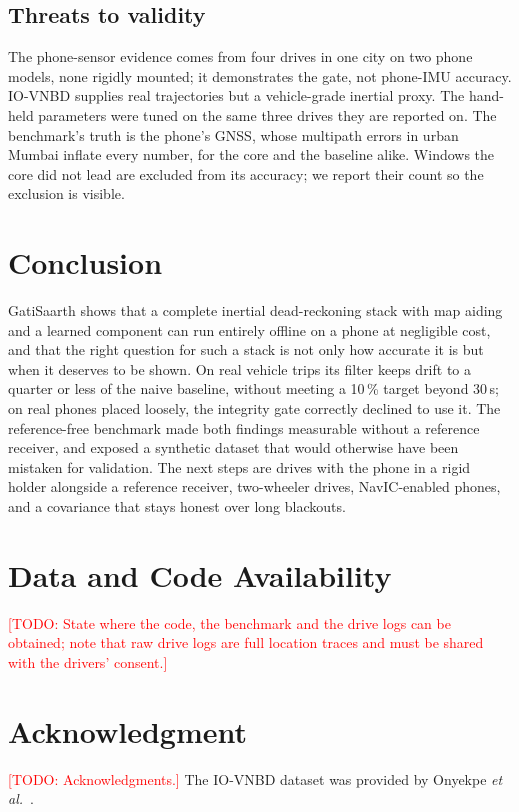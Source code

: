 \documentclass[conference]{IEEEtran}
\newcommand{\todo}[1]{\textcolor{red}{[TODO: #1]}}
\begin{document}
\subsection{Threats to validity}
The phone-sensor evidence comes from four drives in one city on two phone
models, none rigidly mounted; it demonstrates the gate, not phone-IMU accuracy.
IO-VNBD supplies real trajectories but a vehicle-grade inertial proxy. The
hand-held parameters were tuned on the same three drives they are reported on.
The benchmark's truth is the phone's GNSS, whose multipath errors in urban
Mumbai inflate every number, for the core and the baseline alike. Windows the
core did not lead are excluded from its accuracy; we report their count so the
exclusion is visible.

\section{Conclusion}
GatiSaarth shows that a complete inertial dead-reckoning stack with map aiding
and a learned component can run entirely offline on a phone at negligible cost,
and that the right question for such a stack is not only how accurate it is but
when it deserves to be shown. On real vehicle trips its filter keeps drift to
a quarter or less of the naive baseline, without meeting a 10\,\% target beyond
30\,s; on real phones placed loosely, the integrity gate correctly declined to
use it. The reference-free benchmark made both findings measurable without a
reference receiver, and exposed a synthetic dataset that would otherwise have
been mistaken for validation. The next steps are drives with the phone in a
rigid holder alongside a reference receiver, two-wheeler drives, NavIC-enabled
phones, and a covariance that stays honest over long blackouts.

\section*{Data and Code Availability}
\todo{State where the code, the benchmark and the drive logs can be obtained;
note that raw drive logs are full location traces and must be shared with the
drivers' consent.}

\section*{Acknowledgment}
\todo{Acknowledgments.} The IO-VNBD dataset was provided by Onyekpe
\emph{et al.}~\cite{onyekpe2021iovnbd}.



\end{document}
